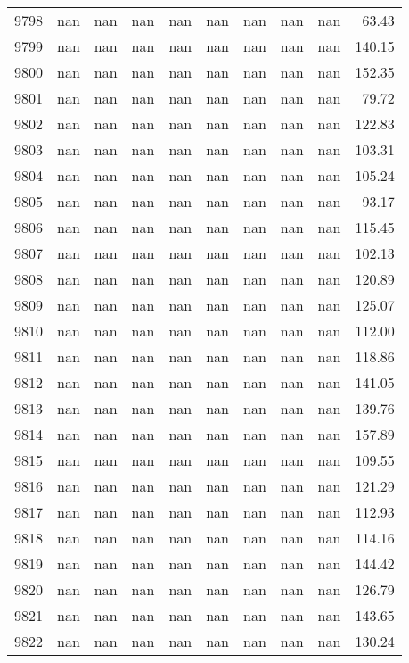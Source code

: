 \begin{tabular}{lrrrrrrrrr}
9798 & nan & nan & nan & nan & nan & nan & nan & nan & 63.43 \\
9799 & nan & nan & nan & nan & nan & nan & nan & nan & 140.15 \\
9800 & nan & nan & nan & nan & nan & nan & nan & nan & 152.35 \\
9801 & nan & nan & nan & nan & nan & nan & nan & nan & 79.72 \\
9802 & nan & nan & nan & nan & nan & nan & nan & nan & 122.83 \\
9803 & nan & nan & nan & nan & nan & nan & nan & nan & 103.31 \\
9804 & nan & nan & nan & nan & nan & nan & nan & nan & 105.24 \\
9805 & nan & nan & nan & nan & nan & nan & nan & nan & 93.17 \\
9806 & nan & nan & nan & nan & nan & nan & nan & nan & 115.45 \\
9807 & nan & nan & nan & nan & nan & nan & nan & nan & 102.13 \\
9808 & nan & nan & nan & nan & nan & nan & nan & nan & 120.89 \\
9809 & nan & nan & nan & nan & nan & nan & nan & nan & 125.07 \\
9810 & nan & nan & nan & nan & nan & nan & nan & nan & 112.00 \\
9811 & nan & nan & nan & nan & nan & nan & nan & nan & 118.86 \\
9812 & nan & nan & nan & nan & nan & nan & nan & nan & 141.05 \\
9813 & nan & nan & nan & nan & nan & nan & nan & nan & 139.76 \\
9814 & nan & nan & nan & nan & nan & nan & nan & nan & 157.89 \\
9815 & nan & nan & nan & nan & nan & nan & nan & nan & 109.55 \\
9816 & nan & nan & nan & nan & nan & nan & nan & nan & 121.29 \\
9817 & nan & nan & nan & nan & nan & nan & nan & nan & 112.93 \\
9818 & nan & nan & nan & nan & nan & nan & nan & nan & 114.16 \\
9819 & nan & nan & nan & nan & nan & nan & nan & nan & 144.42 \\
9820 & nan & nan & nan & nan & nan & nan & nan & nan & 126.79 \\
9821 & nan & nan & nan & nan & nan & nan & nan & nan & 143.65 \\
9822 & nan & nan & nan & nan & nan & nan & nan & nan & 130.24 \\

\end{tabular}

